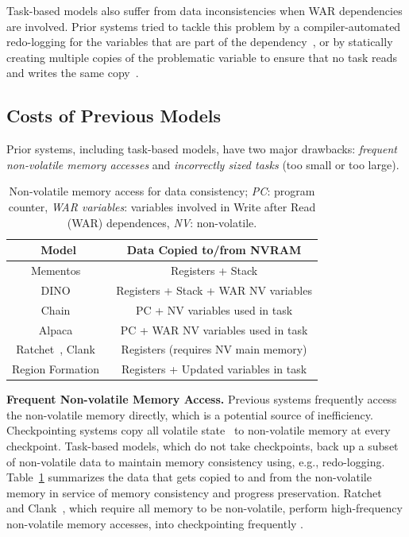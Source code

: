 Task-based models also suffer from data inconsistencies when WAR dependencies are involved.
Prior systems tried to tackle this problem by a compiler-automated
redo-logging for the variables that are part of the dependency~\cite{alpaca}, or
by statically creating multiple copies of the problematic variable to ensure
that no task reads and writes the same copy~\cite{chain}.

\subsection{Costs of Previous Models}
\label{sec:cost_task-based}

Prior systems, including task-based models, have two major drawbacks:
{\em frequent non-volatile memory accesses} and {\em incorrectly sized tasks}
(too small or too large).

\begin{table}
    \centering
    \footnotesize
    \begin{tabular}{|c|c|}
        \hline
        Model & Data Copied to/from NVRAM \\
        \hline\hline
        Mementos~\cite{mementos}	& Registers + Stack     \\
        DINO~\cite{dino}	& Registers + Stack + WAR NV variables \\%
        Chain~\cite{chain}	& PC + NV variables used in task\\
        Alpaca~\cite{alpaca}	& PC + WAR NV variables used in task\\
        Ratchet~\cite{ratchet}, Clank~\cite{hicks_isca_2017} & Registers (requires NV main memory) \\
        Region Formation~\cite{baghsorkhi_cgo_2018} & Registers + Updated variables in task \\
        \hline
    \end{tabular}
    \caption{Non-volatile memory access for data consistency; \emph{PC}: program counter, \emph{WAR variables}: variables involved in Write after Read (WAR) dependences, \emph{NV}: non-volatile.}
    \label{table:chechpoint_comparison}
\end{table}


\textbf{Frequent Non-volatile Memory Access.} 
Previous systems frequently access the non-volatile memory directly, which is a potential source of inefficiency.  Checkpointing systems copy all volatile
state~\cite{dino, mementos, ratchet, hicks_isca_2017} to non-volatile memory at
every checkpoint.  Task-based models, which do not take checkpoints, back up a
subset of non-volatile data to maintain memory consistency using, e.g.,
redo-logging.  Table~\ref{table:chechpoint_comparison} summarizes the data that
gets copied to and from the non-volatile memory in service of memory
consistency and progress preservation.  Ratchet~\cite{ratchet} and
Clank~\cite{hicks_isca_2017}, which require all memory to be non-volatile,
perform high-frequency non-volatile memory accesses, into checkpointing
frequently .

